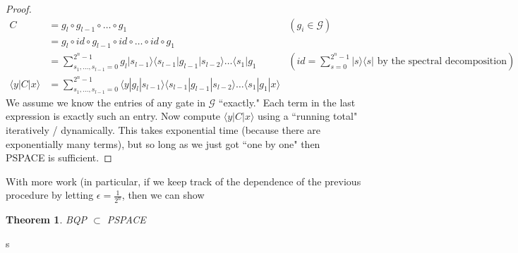 \documentclass{article}
\newtheorem{thm}{Theorem}
\newcommand{\ket}[1]{|#1\rangle}
\newcommand{\bra}[1]{\langle#1|}
\newcommand{\braket}[2]{\langle#1|#2\rangle}
\begin{document}
\begin{proof}
\begin{align*}
    C &= g_l \circ g_{l-1} \circ \dots \circ g_1 & (g_i \in \mathcal{G})\\
    &= g_l \circ id \circ g_{l-1} \circ id \circ \dots \circ id \circ g_1 \\
    &= \sum_{s_1, \dots, s_{l-1} = 0}^{2^n-1} g_l\ket{s_{l-1}}\braket{s_{l-1}}{g_{l-1} | s_{l-2}} \dots \bra{s_1}g_1 &(id = \sum_{s=0}^{2^n-1} \ket{s}\bra{s}\text{ by the spectral decomposition}) \\
    \braket{y}{C|x} &= \sum_{s_1, \dots, s_{l-1} = 0}^{2^n-1} \braket{y}{g_l|s_{l-1}}\braket{s_{l-1}}{g_{l-1} | s_{l-2}} \dots \braket{s_1}{g_1|x}
\end{align*}
We assume we know the entries of any gate in $\mathcal{G}$ ``exactly."  Each term in the last expression is exactly such an entry.  Now compute $\braket{y}{C|x}$ using a ``running total" iteratively / dynamically.  This takes exponential time (because there are exponentially many terms), but so long as we just got ``one by one" then PSPACE is sufficient.    
\end{proof}

With more work (in particular, if we keep track of the dependence of the previous procedure by letting $\epsilon = \frac{1}{2^n}$, then we can show

\begin{thm}
    BQP $\subset$ PSPACE
\end{thm}
s
\end{document}
